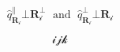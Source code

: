 \documentclass[twocolumn,secnumarabic,amssymb, nobibnotes, aps, prd, superscriptaddress]{revtex4-2}
\begin{document}
$$\hat{q}_{\mathbf{R}_{\mathcal{i}}}^{\parallel} \bot \mathbf{R}_{\mathcal{i}}^{\bot} \;\text{ and }\; \hat{q}_{\mathbf{R}_{\mathcal{i}}}^{\bot} \bot \mathbf{R}_{\mathcal{i}}$$

$$\mathcal{ijk}$$
\end{document}
